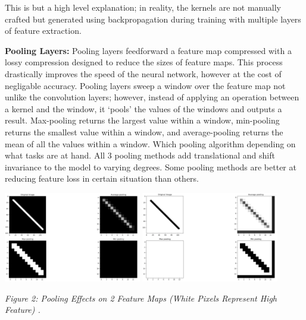 \documentclass[11pt]{article}
\def\paraskip{\vskip 0.4cm}
\begin{document}
        \noindent This is but a high level explanation; in reality, the kernels are not manually crafted but generated using backpropagation during training with multiple layers of feature extraction.

        \paraskip
        \noindent\textbf{Pooling Layers: } Pooling layers feedforward a feature map compressed with a lossy compression designed to reduce the sizes of feature maps. This process drastically improves the speed of the neural network, however at the cost of negligable accuracy. Pooling layers sweep a window over the feature map not unlike the convolution layers; however, instead of applying an operation between a kernel and the window, it `pools' the values of the windows and outputs a result. Max-pooling returns the largest value within a window, min-pooling returns the smallest value within a window, and average-pooling returns the mean of all the values within a window. Which pooling algorithm depending on what tasks are at hand. All 3 pooling methods add translational and shift invariance to the model to varying degrees. Some pooling methods are better at reducing feature loss in certain situation than others.

        \begin{center}
            \includegraphics[width=6cm]{blackpool.png}
            \hspace{2cm}
            \includegraphics[width=6cm]{whitepool.png}
            \\
            \raggedright \textit{
            Figure 2: Pooling Effects on 2 Feature Maps (White Pixels Represent High Feature) \cite{poolingdiff}.
            }
        \end{center}
\end{document}
